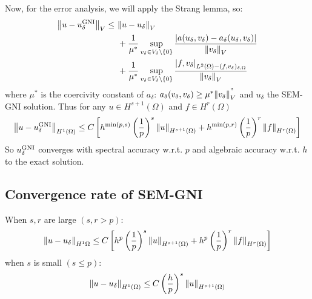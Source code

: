 Now, for the error analysis, we will apply the Strang lemma, so:
\begin{align*}
    \norm{u- u _\delta^{\text{GNI}}}_V \leq \ & \norm{u-u_\delta}_V \\
    & + \frac{1}{\mu^*} \sup_{v_\delta \in V_\delta \backslash\left\{ 0 \right\}} \frac{\abs{a(u_\delta, v_\delta) - a_\delta(u_\delta, v_\delta)}}{\norm{v_\delta}_V} \\
    & + \frac{1}{\mu^*} \sup_{v_\delta \in V_\delta \backslash\left\{ 0 \right\}} \frac{\abs{f,v_\delta}_{L^2(\Omega) - (f,v_\delta)_{\delta,\Omega}}}{\norm{v_\delta}_V}
\end{align*}
where \(\mu^*\) is the coercivity constant of \(a_\delta\): \(a_\delta(v_\delta, v_\delta) \geq \mu^*\norm{v_\delta}^"_V\) and \(u_\delta\) the SEM-GNI solution.
Thus for any \(u \in H^{s+1}(\Omega)\) and \(f \in H^r(\Omega)\) 
\[
    \norm{u-u_\delta^{\text{GNI}}}_{H^1(\Omega)} \leq C\left[ h^{\min(p,s)}\left( \frac{1}{p} \right)^s \norm{u}_{H^{s+1}(\Omega)} + h^{\min(p,r)}\left( \frac{1}{p} \right)^r \norm{f}_{H^{r}(\Omega)}  \right]
\]
So \(u_\delta^{\text{GNI}}\) converges with spectral accuracy w.r.t. \(p\) and algebraic accuracy w.r.t. \(h\) to the exact solution.
\subsection{Convergence rate of SEM-GNI}
When \(s,r\) are large \((s, r > p)\):
\[
    \norm{u-u_\delta}_{H^1{\Omega}} \leq C \left[ h^p \left(\frac{1}{p}\right)^s \norm{u}_{H^{s+1}(\Omega)} + h^p \left(\frac{1}{p}\right)^r \norm{f}_{H^{r}(\Omega)}  \right]
\]
when \(s\) is small \((s \leq p)\):
\[
    \norm{u-u_\delta}_{H^1(\Omega)} \leq C\left( \frac{h}{p} \right)^s \norm{u}_{H^{s+1}(\Omega)}
\]
